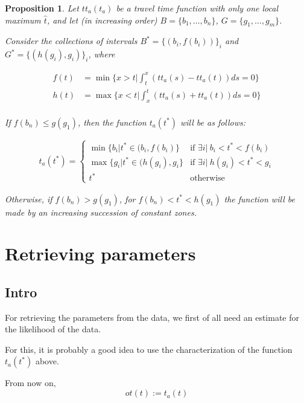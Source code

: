 \documentclass{article}
\newtheorem{prop}{Proposition}
\begin{document}
\begin{prop}
  Let \(tt_a(t_a)\) be a travel time function with only one local maximum \(\hat{t}\),
  and let (in increasing order) \(B = \{b_1, \dots, b_n\}\), \(G = \{g_1, \dots, g_m\}\).


  Consider the collections of intervals \(B^* = \{(b_i, f(b_i))\}_i\) and \(G^* = \{(h(g_i), g_i)\}_i\), where
  
  \begin{align*}
    f(t) & = \min\{x>t | \int_t^x(tt_a(s) - tt_a(t)) ds = 0\} \\
    h(t) & = \max\{x<t | \int_x^t(tt_a(s) + tt_a(t)) ds = 0\} \\
  \end{align*}

  If \(f(b_n) \leq g(g_1)\), then the function \(t_a(t^*)\) will be as follows:

  \begin{align*}
    t_a(t^*) = 
    \begin{cases}
      \min \{b_i | t^* \in (b_i, f(b_i)\} & \text{if } \exists i |\ b_i < t^* < f(b_i) \\
      \max \{g_i | t^* \in (h(g_i), g_i\} & \text{if } \exists i |\ h(g_i) < t^* < g_i \\
      t^* & \text{otherwise}
    \end{cases}
  \end{align*}

  Otherwise, if \(f(b_n) > g(g_1)\), for \(f(b_n) < t^* < h(g_1)\) the function will be made by an increasing succession of constant zones.
\end{prop}

\section{Retrieving parameters}

\subsection{Intro}

For retrieving the parameters from the data, we first of all need an estimate for the likelihood of the data.

For this, it is probably a good idea to use the characterization of the function \(t_a(t^*)\) above.

From now on,
\begin{equation*}
  ot(t) := t_a(t)
\end{equation*}
\end{document}
